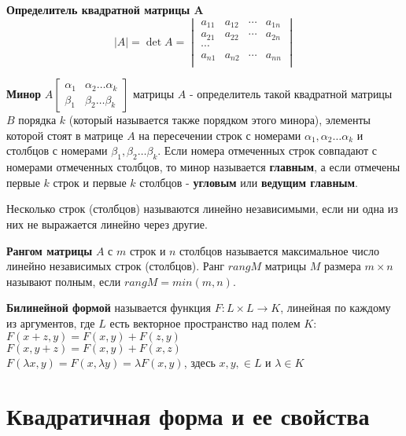 \documentclass[bachelor, och, coursework, times]{SCWorks}
\newcommand\tab[1][1cm]{\hspace*{#1}}
\begin{document}
\textbf{Определитель квадратной матрицы A} $$|A|=\det A=\begin{vmatrix}
a_{11} & a_{12} & \cdots & a_{1n} \\ 
a_{21} & a_{22} & \cdots & a_{2n} \\ 
\cdots \\
a_{n1} & a_{n2} & \cdots & a_{nn} \\ 
\end{vmatrix}
$$

\textbf{Минор} $A \begin{bmatrix} \alpha_1 & \alpha_2 \dots \alpha_k \\ \beta_1 & \beta_2 \dots \beta_k \end{bmatrix}$ матрицы $A$ - определитель такой квадратной матрицы $B$ порядка $k$ (который называется также порядком этого минора), элементы которой стоят в матрице $A$ на пересечении строк с номерами $\alpha_1, \alpha_2 \dots \alpha_k$ и столбцов с номерами $\beta_1, \beta_2 \dots \beta_k$. Если номера отмеченных строк совпадают с номерами отмеченных столбцов, то минор называется \textbf{главным}, а если отмечены первые $k$ строк и первые $k$ столбцов - \textbf{угловым} или \textbf{ведущим главным}. \cite{10}

Несколько строк (столбцов) называются линейно независимыми, если ни одна из них не выражается линейно через другие. \cite{11}

\textbf{Рангом матрицы} $A$ с $m$ строк и $n$ столбцов называется максимальное число линейно независимых строк (столбцов). Ранг $rangM$ матрицы $M$ размера $m \times n$ называют полным, если $rangM = min(m,n)$. \cite{11}

\textbf{Билинейной формой} называется функция $F:L \times L \to K$, линейная по каждому из аргументов, где $L$ есть векторное пространство над полем $K$: \\
\tab $F(x+z,y)=F(x,y)+F(z,y)$ \\
\tab $F(x,y+z)=F(x,y)+F(x,z)$ \\
\tab $F(\lambda x,y)= F(x,\lambda y) = \lambda F(x,y)$, здесь $x,y,\in L$ и $\lambda \in K$ \cite{12}


\section{Квадратичная форма и ее свойства}
\end{document}
